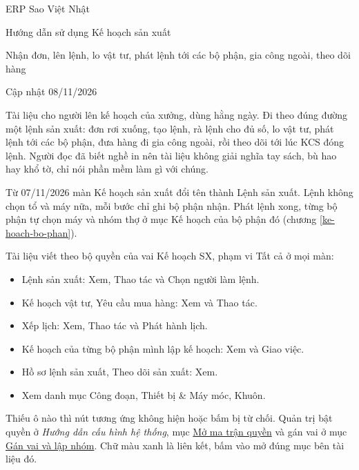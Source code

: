 \documentclass[11pt,a4paper]{article}
\newcommand{\tl}[1]{\textit{#1}}
\newcommand{\cauhinh}{../huong-dan-cau-hinh/cau-hinh-he-thong.pdf}
\newcommand{\kbn}[2]{\href{\cauhinh\##1}{\textcolor{lienket}{#2}}}
\newcommand{\kb}[2]{\tl{Hướng dẫn cấu hình hệ thống}, mục \kbn{#1}{#2}}
\begin{document}
\thispagestyle{empty}
{\tieude\small\color{xamchu} ERP Sao Việt Nhật}\par\vspace{3pt}
{\tieude\fontsize{22}{26}\selectfont Hướng dẫn sử dụng Kế hoạch sản xuất}\par\vspace{4pt}
{\small Nhận đơn, lên lệnh, lo vật tư, phát lệnh tới các bộ phận, gia công ngoài, theo dõi hàng}\par\vspace{2pt}
{\small\color{xamchu} Cập nhật 08/11/2026}\par\vspace{6pt}
\noindent{\color{black!25}\rule{\linewidth}{0.4pt}}\par\vspace{4pt}

Tài liệu cho người lên kế hoạch của xưởng, dùng hằng ngày. Đi theo đúng đường một lệnh sản xuất: đơn rơi xuống,
tạo lệnh, rà lệnh cho đủ số, lo vật tư, phát lệnh tới các bộ phận, đưa hàng đi gia công ngoài, rồi theo dõi tới
lúc KCS đóng lệnh. Người đọc đã biết nghề in nên tài liệu không giải nghĩa tay sách, bù hao hay khổ tờ, chỉ nói
phần mềm làm gì với chúng.

Từ 07/11/2026 màn Kế hoạch sản xuất đổi tên thành Lệnh sản xuất. Lệnh không chọn tổ và máy nữa, mỗi bước chỉ ghi
bộ phận nhận. Phát lệnh xong, từng bộ phận tự chọn máy và nhóm thợ ở mục Kế hoạch của bộ phận đó (chương
\ref{ke-hoach-bo-phan}).

Tài liệu viết theo bộ quyền của vai Kế hoạch SX, phạm vi Tất cả ở mọi màn:

\begin{itemize}
\item Lệnh sản xuất: Xem, Thao tác và Chọn người làm lệnh.
\item Kế hoạch vật tư, Yêu cầu mua hàng: Xem và Thao tác.
\item Xếp lịch: Xem, Thao tác và Phát hành lịch.
\item Kế hoạch của từng bộ phận mình lập kế hoạch: Xem và Giao việc.
\item Hồ sơ lệnh sản xuất, Theo dõi sản xuất: Xem.
\item Xem danh mục Công đoạn, Thiết bị \& Máy móc, Khuôn.
\end{itemize}

Thiếu ô nào thì nút tương ứng không hiện hoặc bấm bị từ chối. Quản trị bật quyền ở \kb{phan-quyen-ma-tran}{Mở ma
trận quyền} và gán vai ở mục \kbn{phan-quyen-gan-vai}{Gán vai và lập nhóm}. Chữ màu xanh là liên kết, bấm vào mở đúng
mục bên tài liệu đó.
\end{document}

